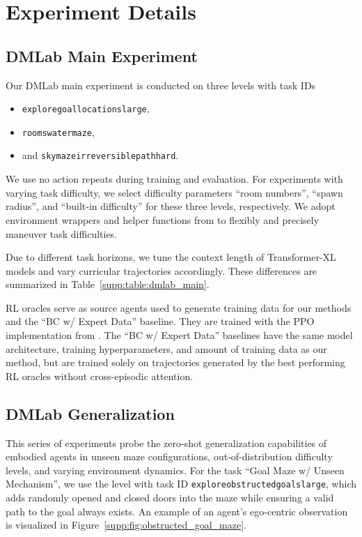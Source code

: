 \section{Experiment Details}
\label{supp:sec:experiment_details}

\subsection{DMLab Main Experiment}
Our DMLab main experiment is conducted on three levels with task IDs
\begin{itemize}
    \item{\texttt{explore\textunderscore{}goal\textunderscore{}locations\textunderscore{}large},}
    \item{\texttt{rooms\textunderscore{}watermaze},}
    \item{and \texttt{skymaze\textunderscore{}irreversible\textunderscore{}path\textunderscore{}hard}.}
\end{itemize}
We use no action repeats during training and evaluation.
For experiments with varying task difficulty, we select difficulty parameters ``room numbers'', ``spawn radius'', and ``built-in difficulty'' for these three levels, respectively.
We adopt environment wrappers and helper functions from \citet{petrenko2020sample} to flexibly and precisely maneuver task difficulties. 

Due to different task horizons, we tune the context length of Transformer-XL models and vary curricular trajectories accordingly. These differences are summarized in Table~\ref{supp:table:dmlab_main}.



RL oracles serve as source agents used to generate training data for our methods and the ``BC w/ Expert Data'' baseline.
They are trained with the PPO~\citep{schulman2017proximal} implementation from \citet{petrenko2020sample}.
The ``BC w/ Expert Data'' baselines have the same model architecture, training hyperparameters, and amount of training data as our method, but are trained solely on trajectories generated by the best performing RL oracles without cross-episodic attention.



\subsection{DMLab Generalization}
\label{supp:sec:dmlab_generalization}
This series of experiments probe the zero-shot generalization capabilities of embodied agents in unseen maze configurations, out-of-distribution difficulty levels, and varying environment dynamics.
For the task ``Goal Maze w/ Unseen Mechanism'', we use the level with task ID \texttt{explore\textunderscore{}obstructed\textunderscore{}goals\textunderscore{}large}, which adds randomly opened and closed doors into the maze while ensuring a valid path to the goal always exists.
An example of an agent's ego-centric observation is visualized in Figure~\ref{supp:fig:obstructed_goal_maze}.

